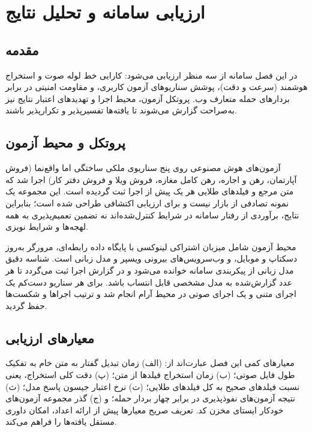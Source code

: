 \documentclass[11pt, a4paper]{report}
\begin{document}
\chapter{ارزیابی سامانه و تحلیل نتایج}


\section{مقدمه}
در این فصل سامانه از سه منظر ارزیابی می‌شود: کارایی خط لوله صوت و استخراج هوشمند (سرعت و دقت)، پوشش سناریوهای آزمون کاربری، و مقاومت امنیتی در برابر بردارهای حمله متعارف وب. پروتکل آزمون، محیط اجرا و تهدیدهای اعتبار نتایج نیز به‌صراحت گزارش می‌شوند تا یافته‌ها تفسیرپذیر و تکرارپذیر باشند.

\section{پروتکل و محیط آزمون}
آزمون‌های هوش مصنوعی روی پنج سناریوی ملکی ساختگی اما واقع‌نما (فروش آپارتمان، رهن و اجاره، رهن کامل مغازه، فروش ویلا و فروش دفتر کار) اجرا شد که متن مرجع و فیلدهای طلایی هر یک پیش از اجرا ثبت گردیده است. این مجموعه یک نمونه تصادفی از بازار نیست و برای ارزیابی اکتشافی طراحی شده است؛ بنابراین نتایج، برآوردی از رفتار سامانه در شرایط کنترل‌شده‌اند نه تضمین تعمیم‌پذیری به همه لهجه‌ها و شرایط نویزی.

محیط آزمون شامل میزبان اشتراکی لینوکسی با پایگاه داده رابطه‌ای، مرورگر به‌روز دسکتاپ و موبایل، و وب‌سرویس‌های بیرونی ویسپر و مدل زبانی است. شناسه دقیق مدل زبانی از پیکربندی سامانه خوانده می‌شود و در گزارش اجرا ثبت می‌گردد تا هر عدد گزارش‌شده به مدل مشخصی قابل انتساب باشد. برای هر سناریو دست‌کم یک اجرای متنی و یک اجرای صوتی در محیط آرام انجام شد و ترتیب اجراها و شکست‌ها حفظ گردید.

\section{معیارهای ارزیابی}
معیارهای کمی این فصل عبارت‌اند از: (الف) زمان تبدیل گفتار به متن خام به تفکیک طول فایل صوتی؛ (ب) زمان استخراج فیلدها از متن؛ (پ) دقت کلی استخراج، یعنی نسبت فیلدهای صحیح به کل فیلدهای طلایی؛ (ت) نرخ اعتبار جیسون پاسخ مدل؛ (ث) نتیجه آزمون‌های نفوذپذیری در برابر چهار بردار حمله؛ و (ج) گذر مجموعه آزمون‌های خودکار ایستای مخزن کد. تعریف صریح معیارها پیش از ارائه اعداد، امکان داوری مستقل یافته‌ها را فراهم می‌کند.
\end{document}
